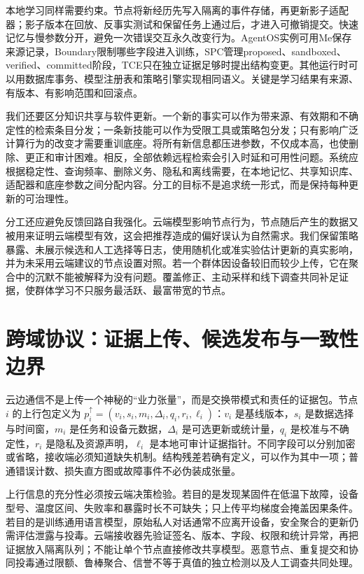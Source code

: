 本地学习同样需要约束。节点将新经历先写入隔离的事件存储，再更新影子适配器；影子版本在回放、反事实测试和保留任务上通过后，才进入可撤销提交。快速记忆与慢参数分开，避免一次错误交互永久改变行为。AgentOS实例可用Me保存来源记录，Boundary限制哪些字段进入训练，SPC管理proposed、sandboxed、verified、committed阶段，TCE只在独立证据足够时提出结构变更。其他运行时可以用数据库事务、模型注册表和策略引擎实现相同语义。关键是学习结果有来源、有版本、有影响范围和回滚点。

我们还要区分知识共享与软件更新。一个新的事实可以作为带来源、有效期和不确定性的检索条目分发；一条新技能可以作为受限工具或策略包分发；只有影响广泛计算行为的改变才需要重训底座。将所有新信息都压进参数，不仅成本高，也使删除、更正和审计困难。相反，全部依赖远程检索会引入时延和可用性问题。系统应根据稳定性、查询频率、删除义务、隐私和离线需要，在本地记忆、共享知识库、适配器和底座参数之间分配内容。分工的目标不是追求统一形式，而是保持每种更新的可治理性。

分工还应避免反馈回路自我强化。云端模型影响节点行为，节点随后产生的数据又被用来证明云端模型有效，这会把推荐造成的偏好误认为自然需求。我们保留策略暴露、未展示候选和人工选择等日志，使用随机化或准实验估计更新的真实影响，并为未采用云端建议的节点设置对照。若一个群体因设备较旧而较少上传，它在聚合中的沉默不能被解释为没有问题。覆盖修正、主动采样和线下调查共同补足证据，使群体学习不只服务最活跃、最富带宽的节点。

\section{跨域协议：证据上传、候选发布与一致性边界}
\label{sec:cross_manifold_protocol}

云边通信不是上传一个神秘的“业力张量”，而是交换带模式和责任的证据包。节点 $i$ 的上行包定义为 $p_i^{\uparrow}=(v_i,s_i,m_i,\Delta_i,q_i,r_i,\ell_i)$：$v_i$ 是基线版本，$s_i$ 是数据选择与时间窗，$m_i$ 是任务和设备元数据，$\Delta_i$ 是可选更新或统计量，$q_i$ 是校准与不确定性，$r_i$ 是隐私及资源声明，$\ell_i$ 是本地可审计证据指针。不同字段可以分别加密或省略，接收端必须知道缺失机制。结构残差若确有定义，可以作为其中一项；普通错误计数、损失直方图或故障事件不必伪装成张量。

上行信息的充分性必须按云端决策检验。若目的是发现某固件在低温下故障，设备型号、温度区间、失败率和暴露时长不可缺失；只上传平均梯度会掩盖因果条件。若目的是训练通用语言模型，原始私人对话通常不应离开设备，安全聚合的更新仍需评估泄露与投毒。云端接收器先验证签名、版本、字段、权限和统计异常，再把证据放入隔离队列；不能让单个节点直接修改共享模型。恶意节点、重复提交和协同投毒通过限额、鲁棒聚合、信誉不等于真值的独立检测以及人工调查共同处理。

